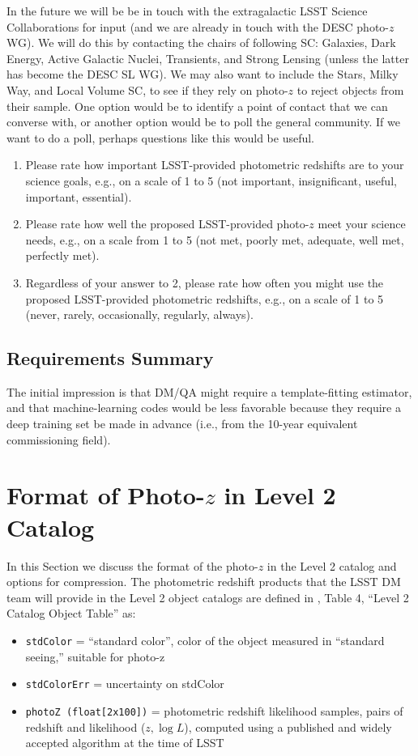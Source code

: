 \documentclass[DM,lsstdraft,toc]{lsstdoc}
\begin{document}
\smallskip
In the future we will be be in touch with the extragalactic LSST Science Collaborations for input (and we are already in touch with the DESC photo-$z$ WG). We will do this by contacting the chairs of following SC: Galaxies, Dark Energy, Active Galactic Nuclei, Transients, and Strong Lensing (unless the latter has become the DESC SL WG). We may also want to include the Stars, Milky Way, and Local Volume SC, to see if they rely on photo-$z$ to reject objects from their sample. One option would be to identify a point of contact that we can converse with, or another option would be to poll the general community. If we want to do a poll, perhaps questions like this would be useful.
\begin{enumerate}
\item Please rate how important LSST-provided photometric redshifts are to your science goals, e.g., on a scale of 1 to 5 (not important, insignificant, useful, important, essential).
\item Please rate how well the proposed LSST-provided photo-$z$ meet your science needs, e.g., on a scale from 1 to 5 (not met, poorly met, adequate, well met, perfectly met).
\item Regardless of your answer to 2, please rate how often you might use the proposed LSST-provided photometric redshifts, e.g., on a scale of 1 to 5 (never, rarely, occasionally, regularly, always).
\end{enumerate}

\subsection{Requirements Summary}

The initial impression is that DM/QA might require a template-fitting estimator, and that machine-learning codes would be less favorable because they require a deep training set be made in advance (i.e., from the 10-year equivalent commissioning field).


\section{Format of Photo-$z$ in Level 2 Catalog}\label{sec:format}

In this Section we discuss the format of the photo-$z$ in the Level 2 catalog and options for compression. The photometric redshift products that the LSST DM team will provide in the Level 2 object catalogs are defined in \DPDD, Table 4, ``Level 2 Catalog Object Table'' as:
\begin{itemize}
\item \texttt{stdColor} = ``standard color'', color of the object measured in ``standard seeing,'' suitable for photo-z
\item \texttt{stdColorErr} = uncertainty on stdColor
\item \texttt{photoZ (float[2x100])} = photometric redshift likelihood samples, pairs of redshift and likelihood ($z,\log{L}$), computed using a published and widely accepted algorithm at the time of LSST
\end{itemize}
\end{document}

